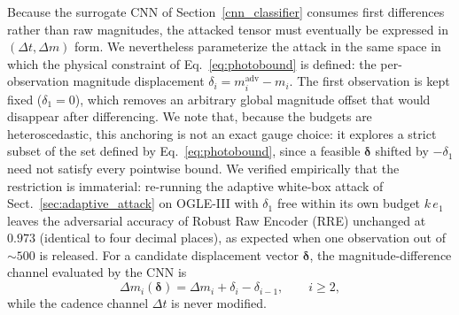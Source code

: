 \documentclass{aa}
\begin{document}
Because the surrogate CNN of Section~\ref{cnn_classifier} consumes first differences rather than raw magnitudes, the attacked tensor must eventually be expressed in $(\Delta t,\Delta m)$ form. We nevertheless parameterize the attack in the same space in which the physical constraint of Eq.~\eqref{eq:photobound} is defined: the per-observation magnitude displacement
$\delta_i = m_i^{\mathrm{adv}} - m_i$. The first observation is kept fixed ($\delta_1=0$), which removes an arbitrary global magnitude offset that would disappear after differencing. We note that, because the budgets are heteroscedastic, this anchoring is not an exact gauge choice: it explores a strict subset of the set defined by Eq.~\eqref{eq:photobound}, since a feasible $\boldsymbol{\delta}$ shifted by $-\delta_1$ need not satisfy every pointwise bound. We verified empirically that the restriction is immaterial: re-running the adaptive white-box attack of Sect.~\ref{sec:adaptive_attack} on OGLE-III with $\delta_1$ free within its own budget $k\,e_1$ leaves the adversarial accuracy of Robust Raw Encoder (RRE) unchanged at $0.973$ (identical to four decimal places), as expected when one observation out of ${\sim}500$ is released. For a candidate displacement vector $\boldsymbol{\delta}$, the magnitude-difference channel evaluated by the CNN is
\begin{equation}
\Delta m_i(\boldsymbol{\delta}) =
\Delta m_i + \delta_i - \delta_{i-1}, \qquad i \ge 2,
\end{equation}
while the cadence channel $\Delta t$ is never modified.
\end{document}
